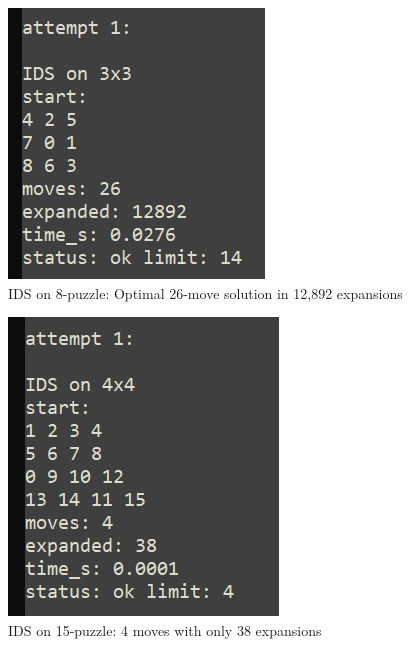 \documentclass[letterpaper]{article}
\begin{document}
\begin{figure}[h]
\centering
\includegraphics[width=0.85\columnwidth]{ids_3x3.jpg}
\caption{IDS on 8-puzzle: Optimal 26-move solution in 12,892 expansions}
\end{figure}

\begin{figure}[h]
\centering
\includegraphics[width=0.85\columnwidth]{ids_4x4.jpg}
\caption{IDS on 15-puzzle: 4 moves with only 38 expansions}
\end{figure}
\end{document}
